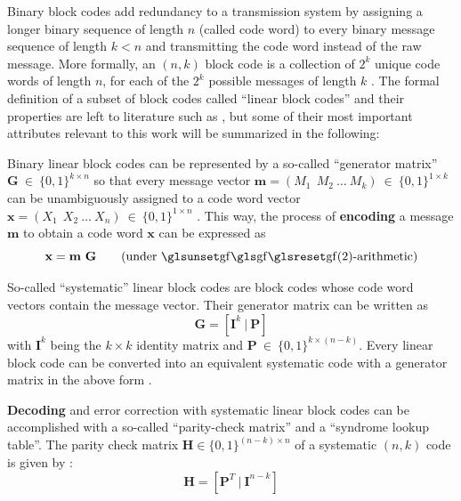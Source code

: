 Binary block codes add redundancy to a transmission system by assigning a longer binary sequence of length $n$ (called code word) to every binary message sequence of length $k < n$ and transmitting the code word instead of the raw message.
More formally, an $(n, k)$ block code is a collection of $2^k$ unique code words of length $n$, for each of the $2^k$ possible messages of length $k$ \cite[Section 13.2]{commsys}.
The formal definition of a subset of block codes called ``linear block codes'' and their properties are left to literature such as \cite[Section 13.2]{carlson_commsys}, but some of their most important attributes relevant to this work will be summarized in the following:

Binary linear block codes can be represented by a so-called ``generator matrix'' $\mathbf G ~ \in ~ \{ 0, 1 \}^{k \times n}$ so that every message vector $\mathbf m = (M_1 ~~ M_2 ~ \dots ~ M_k) ~ \in ~ \{ 0, 1 \}^{1 \times k}$ can be unambiguously assigned to a code word vector $\mathbf x = (X_1 ~~ X_2 ~ \dots ~ X_n) ~ \in ~ \{ 0, 1 \}^{1 \times n}$ \cite[Section 13.2]{carlson_commsys}.
This way, the process of \textbf{encoding} a message $\mathbf m$ to obtain a code word $\mathbf x$ can be expressed as
\begin{equation}
	\mathbf x = \mathbf m ~ \mathbf G \qquad \text{(under $\GF(2)$-arithmetic)}
	\label{eq:downlink_generator_encoding}
\end{equation}

So-called ``systematic'' linear block codes are block codes whose code word vectors contain the message vector.
Their generator matrix can be written as
\begin{equation}
	\mathbf G = \left[ \mathbf I^k ~ | ~ \mathbf P \right]
\end{equation}
with $\mathbf I^k$ being the $k \times k$ identity matrix and $\mathbf P ~ \in ~ \{ 0, 1 \} ^ {k \times (n - k)}$.
Every linear block code can be converted into an equivalent systematic code with a generator matrix in the above form \cite[Section 3.4]{ecctechniques}.

\textbf{Decoding} and error correction with systematic linear block codes can be accomplished with a so-called ``parity-check matrix'' and a ``syndrome lookup table''.
The parity check matrix $\mathbf H \in \{ 0, 1 \}^{(n - k) \times n}$ of a systematic $(n, k)$ code is given by \cite[Equation (13.2.14)]{commsys}:
\begin{equation}
	\mathbf H = \left[ \mathbf P^T ~ | ~ \mathbf I^{n - k} \right]
\end{equation}

